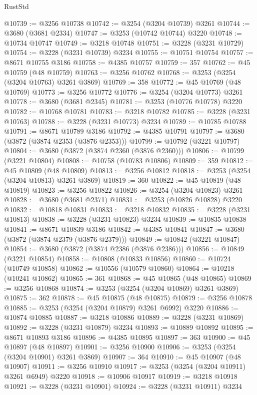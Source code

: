 \begin{lexlean}{RustStd}
\begin{coremodule}
@10739 := @3256 @10738
@10742 := @3254 (@3204 @10739) @3261
@10744 := @3680 (@3681 @2334)
@10747 := @3253 (@10742 @10744) @3220
@10748 := @10734 @10747
@10749 := @3218 @10748
@10751 := @3228 (@3231 @10729)
@10754 := @3228 (@3231 @10739) @3234
@10755 := @10751 @10754
@10757 := @8671 @10755 @3186
@10758 := @4385 @10757
@10759 := 357
@10762 := @45 @10759 (@48 @10759)
@10763 := @3256 @10762
@10768 := @3253 (@3254 (@3204 @10763) @3261 @3869)
@10769 := 358
@10772 := @45 @10769 (@48 @10769)
@10773 := @3256 @10772
@10776 := @3254 (@3204 @10773) @3261
@10778 := @3680 (@3681 @2345)
@10781 := @3253 (@10776 @10778) @3220
@10782 := @10768 @10781
@10783 := @3218 @10782
@10785 := @3228 (@3231 @10763)
@10788 := @3228 (@3231 @10773) @3234
@10789 := @10785 @10788
@10791 := @8671 @10789 @3186
@10792 := @4385 @10791
@10797 := @3680 (@3872 (@3874 @2353 (@3876 @2353)))
@10799 := @10792 (@3221 @10797)
@10804 := @3680 (@3872 (@3874 @2360 (@3876 @2360)))
@10806 := @10799 (@3221 @10804)
@10808 := @10758 (@10783 @10806)
@10809 := 359
@10812 := @45 @10809 (@48 @10809)
@10813 := @3256 @10812
@10818 := @3253 (@3254 (@3204 @10813) @3261 @3869)
@10819 := 360
@10822 := @45 @10819 (@48 @10819)
@10823 := @3256 @10822
@10826 := @3254 (@3204 @10823) @3261
@10828 := @3680 (@3681 @2371)
@10831 := @3253 (@10826 @10828) @3220
@10832 := @10818 @10831
@10833 := @3218 @10832
@10835 := @3228 (@3231 @10813)
@10838 := @3228 (@3231 @10823) @3234
@10839 := @10835 @10838
@10841 := @8671 @10839 @3186
@10842 := @4385 @10841
@10847 := @3680 (@3872 (@3874 @2379 (@3876 @2379)))
@10849 := @10842 (@3221 @10847)
@10854 := @3680 (@3872 (@3874 @2386 (@3876 @2386)))
@10856 := @10849 (@3221 @10854)
@10858 := @10808 (@10833 @10856)
@10860 := @10724 (@10749 @10858)
@10862 := @10556 (@10579 @10860)
@10864 := @10218 (@10241 @10862)
@10865 := 361
@10868 := @45 @10865 (@48 @10865)
@10869 := @3256 @10868
@10874 := @3253 (@3254 (@3204 @10869) @3261 @3869)
@10875 := 362
@10878 := @45 @10875 (@48 @10875)
@10879 := @3256 @10878
@10885 := @3253 (@3254 (@3204 @10879) @3261 @6992) @3220
@10886 := @10874 @10885
@10887 := @3218 @10886
@10889 := @3228 (@3231 @10869)
@10892 := @3228 (@3231 @10879) @3234
@10893 := @10889 @10892
@10895 := @8671 @10893 @3186
@10896 := @4385 @10895
@10897 := 363
@10900 := @45 @10897 (@48 @10897)
@10901 := @3256 @10900
@10906 := @3253 (@3254 (@3204 @10901) @3261 @3869)
@10907 := 364
@10910 := @45 @10907 (@48 @10907)
@10911 := @3256 @10910
@10917 := @3253 (@3254 (@3204 @10911) @3261 @6949) @3220
@10918 := @10906 @10917
@10919 := @3218 @10918
@10921 := @3228 (@3231 @10901)
@10924 := @3228 (@3231 @10911) @3234

\end{coremodule}
\end{lexlean}
